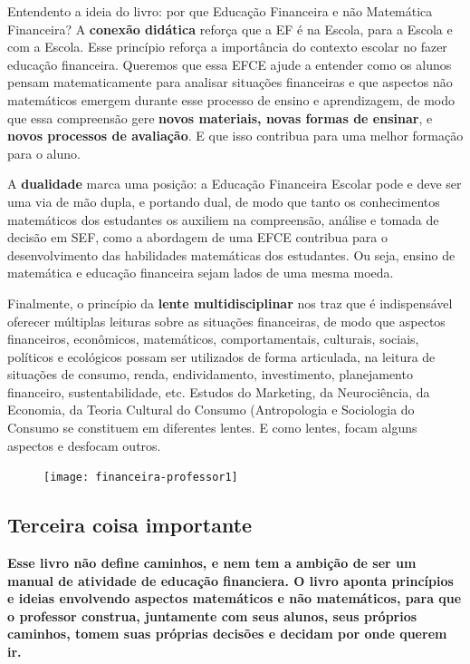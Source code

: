 \begin{apresentacao}{Entendento a ideia do livro: por que Educação Financeira e não Matemática Financeira?}
A \textbf{conexão didática} reforça que a EF é na Escola, para a Escola e com a Escola. Esse princípio reforça a importância do contexto escolar no fazer educação financeira. Queremos que essa EFCE ajude a entender como os alunos pensam matematicamente para analisar situações financeiras e que aspectos não matemáticos emergem durante esse processo de ensino e aprendizagem, de modo que essa compreensão gere \textbf{novos materiais, novas formas de ensinar}, e \textbf{novos processos de avaliação}. E que isso contribua para uma melhor formação para o aluno.

A \textbf{dualidade} marca uma posição: a Educação Financeira Escolar pode e deve ser uma via de mão dupla, e portando dual, de modo que tanto os conhecimentos matemáticos dos estudantes os auxiliem na compreensão, análise e tomada de decisão em SEF, como a abordagem de uma EFCE contribua para o desenvolvimento das habilidades matemáticas dos estudantes. Ou seja, ensino de matemática e educação financeira sejam lados de uma mesma moeda.

Finalmente, o princípio da \textbf{lente multidisciplinar} nos traz que é indispensável oferecer múltiplas leituras sobre as situações financeiras, de modo que aspectos financeiros, econômicos, matemáticos, comportamentais, culturais, sociais, políticos e ecológicos possam ser utilizados de forma articulada, na leitura de situações de consumo, renda, endividamento, investimento, planejamento financeiro, sustentabilidade, etc. Estudos do Marketing, da Neurociência, da Economia, da Teoria Cultural do Consumo (Antropologia e Sociologia do Consumo se constituem em diferentes lentes. E como lentes, focam alguns aspectos e desfocam outros.

\begin{figure}[H]
\centering

\texttt{[image: financeira-professor1]}
\end{figure}

\subsection{Terceira coisa importante}

\begin{center}
\textbf{Esse livro não define caminhos, e nem tem a ambição de ser um manual de atividade de educação financiera. O livro aponta princípios e ideias envolvendo aspectos matemáticos e não matemáticos, para que o professor construa, juntamente com seus alunos, seus próprios caminhos, tomem suas próprias decisões e decidam por onde querem ir.}
\end{center}


\end{apresentacao}
